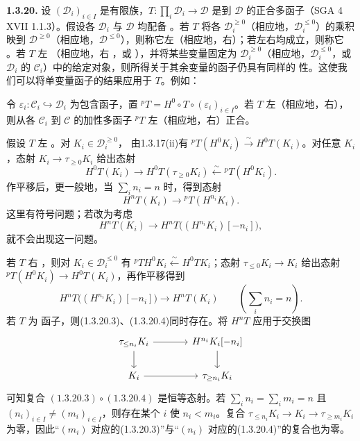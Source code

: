 \par\medskip\noindent\textbf{1.3.20.} 设 $(\mathcal D_i)_{i\in I}$ 是有限族，$T:\prod_i\mathcal D_i\to\mathcal D$ 是到 $\mathcal D$ 的正合多函子（SGA 4 XVII 1.1.3）。假设各 $\mathcal D_i$ 与 $\mathcal D$ 均配备 。若 $T$ 将各 $\mathcal D_i^{\geq0}$（相应地，$\mathcal D_i^{\leq0}$）的乘积映到 $\mathcal D^{\geq0}$（相应地，$\mathcal D^{\leq0}$），则称它左（相应地，右）；若左右均成立，则称它 。若 $T$ 左 （相应地，右 ，或 ），并将某些变量固定为 $\mathcal D_i^{\geq0}$（相应地，$\mathcal D_i^{\leq0}$，或 $\mathcal D_i$ 的 $\mathcal C_i$）中的给定对象，则所得关于其余变量的函子仍具有同样的 性。这使我们可以将单变量函子的结果应用于 $T$。例如：

令 $\varepsilon_i:\mathcal C_i\hookrightarrow\mathcal D_i$ 为包含函子，置 ${}^pT=H^0\circ T\circ(\varepsilon_i)_{i\in I}$。若 $T$ 左（相应地，右），则从各 $\mathcal C_i$ 到 $\mathcal C$ 的加性多函子 ${}^pT$ 左（相应地，右）正合。

假设 $T$ 左 。对 $K_i\in\mathcal D_i^{\geq0}$，
由1.3.17(ii)有 ${}^pT(H^0K_i)\xrightarrow{\sim}H^0T(K_i)$。对任意 $K_i$，态射 $K_i\to\tau_{\geq0}K_i$ 给出态射
\begin{equation*}
 H^0T(K_i)\longrightarrow H^0T(\tau_{\geq0}K_i)\xleftarrow{\sim}{}^pT(H^0K_i).\tag{1.3.20.1}
\end{equation*}
作平移后，更一般地，当 $\sum_i n_i=n$ 时，得到态射
\begin{equation*}
 H^nT(K_i)\longrightarrow{}^pT(H^{n_i}K_i).\tag{1.3.20.2}
\end{equation*}
这里有符号问题；若改为考虑
\begin{equation*}
 H^nT(K_i)\longrightarrow H^nT\bigl((H^{n_i}K_i)[-n_i]\bigr),\tag{1.3.20.3}
\end{equation*}
就不会出现这一问题。

若 $T$ 右 ，则对 $K_i\in\mathcal D_i^{\leq0}$ 有 ${}^pTH^0K_i\xleftarrow{\sim}H^0TK_i$；态射 $\tau_{\leq0}K_i\to K_i$ 给出态射 ${}^pT(H^0K_i)\to H^0T(K_i)$，再作平移得到
\begin{equation*}
 H^nT\bigl((H^{n_i}K_i)[-n_i]\bigr)\longrightarrow H^nT(K_i)
 \qquad\left(\sum_i n_i=n\right).\tag{1.3.20.4}
\end{equation*}
若 $T$ 为 函子，则(1.3.20.3)、(1.3.20.4)同时存在。将 $H^nT$ 应用于交换图
\[
\begin{tikzcd}[ampersand replacement=\&,column sep=large]
 \tau_{\leq n_i}K_i\arrow[r]\arrow[d]\&H^{n_i}K_i[-n_i]\arrow[d]\\
 K_i\arrow[r]\&\tau_{\geq n_i}K_i
\end{tikzcd}
\]
可知复合 $(1.3.20.3)\circ(1.3.20.4)$ 是恒等态射。若 $\sum_i n_i=\sum_i m_i=n$ 且 $(n_i)_{i\in I}\neq(m_i)_{i\in I}$，则存在某个 $i$ 使 $n_i<m_i$。复合 $\tau_{\leq n_i}K_i\to K_i\to\tau_{\geq m_i}K_i$ 为零，因此“$(m_i)$ 对应的(1.3.20.3)”与“$(n_i)$ 对应的(1.3.20.4)”的复合也为零。

